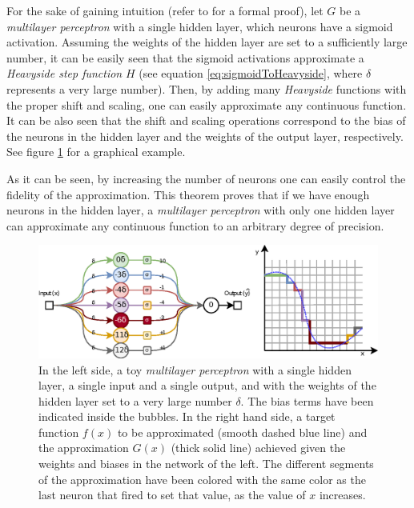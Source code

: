 For the sake of gaining intuition (refer to \autocite{Cybenko1989} for a formal proof), let $G$ be a \textit{multilayer perceptron} with a single hidden layer, which neurons have a sigmoid activation. Assuming the weights of the hidden layer are set to a sufficiently large number, it can be easily seen that the sigmoid activations approximate a \textit{Heavyside step function} $H$ (see equation \ref{eq:sigmoidToHeavyside}, where $\delta$ represents a very large number). Then, by adding many \textit{Heavyside} functions with the proper shift and scaling, one can easily approximate any continuous function. It can be also seen that the shift and scaling operations correspond to the bias of the neurons in the hidden layer and the weights of the output layer, respectively. See figure \ref{fig:universalapprox} for a graphical example. 

As it can be seen, by increasing the number of neurons one can easily control the fidelity of the approximation. This theorem proves that if we have enough neurons in the hidden layer, a \textit{multilayer perceptron} with only one hidden layer can approximate any continuous function to an arbitrary degree of precision.


\begin{figure}[h!]
	\centering
	\includegraphics[width=1\linewidth]{background/images/universalapprox}
	\caption[Universal approximation theorem visual example]{In the left side, a toy \textit{multilayer perceptron} with a single hidden layer, a single input and a single output, and with the weights of the hidden layer set to a very large number $\delta$. The bias terms have been indicated inside the bubbles. In the right hand side, a target function $f(x)$ to be approximated (smooth dashed blue line) and the approximation $G(x)$ (thick solid line) achieved given the weights and biases in the network of the left. The different segments of the approximation have been colored with the same color as the last neuron that fired to set that value, as the value of $x$ increases.}
	\label{fig:universalapprox}
\end{figure}

